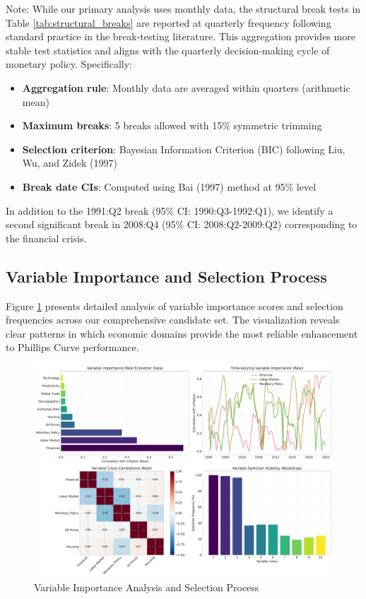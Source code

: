 \documentclass[12pt]{article}
\begin{document}
Note: While our primary analysis uses monthly data, the structural break tests in Table \ref{tab:structural_breaks} are reported at quarterly frequency following standard practice in the break-testing literature. This aggregation provides more stable test statistics and aligns with the quarterly decision-making cycle of monetary policy. Specifically:
\begin{itemize}
\item \textbf{Aggregation rule}: Monthly data are averaged within quarters (arithmetic mean)
\item \textbf{Maximum breaks}: 5 breaks allowed with 15\% symmetric trimming
\item \textbf{Selection criterion}: Bayesian Information Criterion (BIC) following Liu, Wu, and Zidek (1997)
\item \textbf{Break date CIs}: Computed using Bai (1997) method at 95\% level
\end{itemize}
In addition to the 1991:Q2 break (95\% CI: 1990:Q3-1992:Q1), we identify a second significant break in 2008:Q4 (95\% CI: 2008:Q2-2009:Q2) corresponding to the financial crisis.

\subsection{Variable Importance and Selection Process}

Figure \ref{fig:variable_selection} presents detailed analysis of variable importance scores and selection frequencies across our comprehensive candidate set. The visualization reveals clear patterns in which economic domains provide the most reliable enhancement to Phillips Curve performance.

\begin{figure}[H]
\centering
\includegraphics[width=\textwidth]{figures/variable_selection.pdf}
\caption{Variable Importance Analysis and Selection Process}
\label{fig:variable_selection}
\end{figure}
\end{document}

